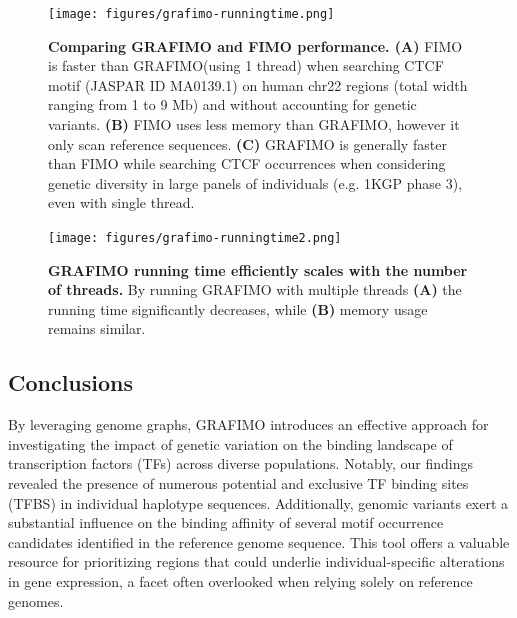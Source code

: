 \documentclass[a4paper, titlepage, openright]{book}
\newcommand{\grafimo}{GRAFIMO\xspace}
\begin{document}
\begin{figure}
    \centering
    \texttt{[image: figures/grafimo-runningtime.png]}
    \caption[Comparing \grafimo and FIMO performance]{\textbf{Comparing \grafimo and FIMO performance. (A)} FIMO is faster than \grafimo (using 1 thread) when searching CTCF motif (JASPAR ID MA0139.1) on human chr22 regions (total width ranging from 1 to 9 Mb) and without accounting for genetic variants. \textbf{(B)} FIMO uses less memory than \grafimo, however it only scan reference sequences. \textbf{(C)} \grafimo is generally faster than FIMO while searching CTCF occurrences when considering genetic diversity in large panels of individuals (e.g. 1KGP phase 3), even with single thread.}
    \label{fig:grafimo-fimo-cmp1}
\end{figure}

\begin{figure}
    \centering
    \texttt{[image: figures/grafimo-runningtime2.png]}
    \caption[\grafimo running time efficiently scales with the number of threads]{\textbf{\grafimo running time efficiently scales with the number of threads.} By running \grafimo with multiple threads \textbf{(A)} the running time significantly decreases, while \textbf{(B)} memory usage remains similar.}
    \label{fig:grafimo-fimo-cmp2}
\end{figure}

\subsection{Conclusions}
By leveraging genome graphs, \grafimo introduces an effective approach for investigating the impact of genetic variation on the binding landscape of transcription factors (TFs) across diverse populations. Notably, our findings revealed the presence of numerous potential and exclusive TF binding sites (TFBS) in individual haplotype sequences. Additionally, genomic variants exert a substantial influence on the binding affinity of several motif occurrence candidates identified in the reference genome sequence. This tool offers a valuable resource for prioritizing regions that could underlie individual-specific alterations in gene expression, a facet often overlooked when relying solely on reference genomes.


\end{document}
